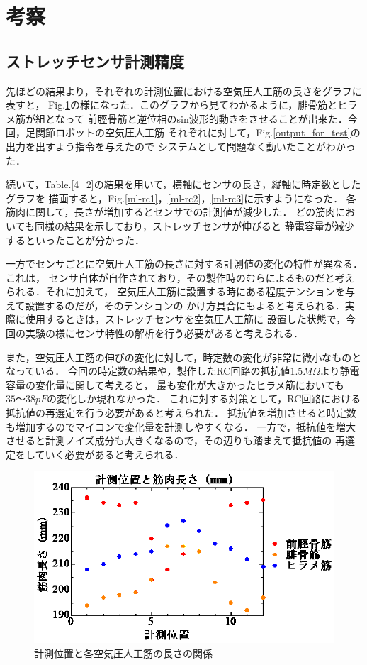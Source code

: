 \section{考察}
\subsection{ストレッチセンサ計測精度}
先ほどの結果より，それぞれの計測位置における空気圧人工筋の長さをグラフに表すと，
Fig.\ref{4-ml}の様になった．このグラフから見てわかるように，腓骨筋とヒラメ筋が組となって
前脛骨筋と逆位相のsin波形的動きをさせることが出来た．今回，足関節ロボットの空気圧人工筋
それぞれに対して，Fig.\ref{output_for_test}の出力を出すよう指令を与えたので
システムとして問題なく動いたことがわかった．

続いて，Table.\ref{4_2}の結果を用いて，横軸にセンサの長さ，縦軸に時定数としたグラフを
描画すると，Fig.\ref{ml-rc1}，\ref{ml-rc2}，\ref{ml-rc3}に示すようになった．
各筋肉に関して，長さが増加するとセンサでの計測値が減少した．
どの筋肉においても同様の結果を示しており，ストレッチセンサが伸びると
静電容量が減少するといったことが分かった．

一方でセンサごとに空気圧人工筋の長さに対する計測値の変化の特性が異なる．これは，
センサ自体が自作されており，その製作時のむらによるものだと考えられる．それに加えて，
空気圧人工筋に設置する時にある程度テンションを与えて設置するのだが，そのテンションの
かけ方具合にもよると考えられる．実際に使用するときは，ストレッチセンサを空気圧人工筋に
設置した状態で，今回の実験の様にセンサ特性の解析を行う必要があると考えられる．

また，空気圧人工筋の伸びの変化に対して，時定数の変化が非常に微小なものとなっている．
今回の時定数の結果や，製作したRC回路の抵抗値$1.5M\Omega$より静電容量の変化量に関して考えると，
最も変化が大きかったヒラメ筋においても$35～38pF$の変化しか現れなかった．
これに対する対策として，RC回路における抵抗値の再選定を行う必要があると考えられた．
抵抗値を増加させると時定数も増加するのでマイコンで変化量を計測しやすくなる．
一方で，抵抗値を増大させると計測ノイズ成分も大きくなるので，その辺りも踏まえて抵抗値の
再選定をしていく必要があると考えられる．

\begin{figure}[h]
    \begin{center}
        \includegraphics[width=0.7\columnwidth,clip]{4_consideration/ml.eps}
    \end{center}
    \caption{計測位置と各空気圧人工筋の長さの関係}
    \label{4-ml}
\end{figure}

